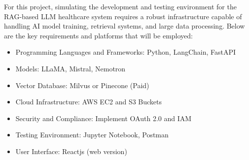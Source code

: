For this project, simulating the development and testing environment for the RAG-based LLM healthcare system requires a robust infrastructure capable of handling AI model training, retrieval systems, and large data processing. Below are the key requirements and platforms that will be employed:
\begin{itemize}
    \item Programming Languages and Frameworks: Python, LangChain, FastAPI 
    \item Models: LLaMA, Mistral, Nemotron
    \item Vector Database: Milvus or Pinecone (Paid)
    \item Cloud Infrastructure: AWS EC2 and S3 Buckets
    \item Security and Compliance: Implement OAuth 2.0 and IAM
    \item Testing Environment: Jupyter Notebook, Postman
    \item User Interface: Reactjs (web version)
\end{itemize}